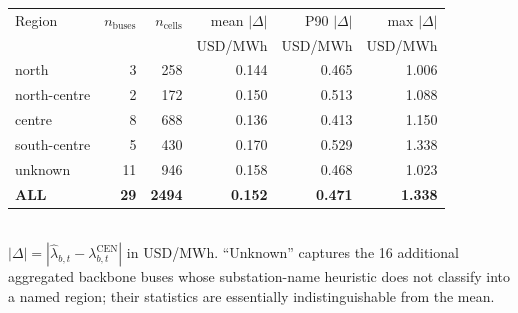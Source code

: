 \begin{tabular}{l r r r r r}
  \toprule
  Region        & $n_{\mathrm{buses}}$ & $n_{\mathrm{cells}}$ &
                  mean $|\Delta|$ & P90 $|\Delta|$ & max $|\Delta|$ \\
                & & & USD/MWh & USD/MWh & USD/MWh \\
  \midrule
  north         &  3 &  258 & 0.144 & 0.465 & 1.006 \\
  north-centre  &  2 &  172 & 0.150 & 0.513 & 1.088 \\
  centre        &  8 &  688 & 0.136 & 0.413 & 1.150 \\
  south-centre  &  5 &  430 & 0.170 & 0.529 & 1.338 \\
  unknown       & 11 &  946 & 0.158 & 0.468 & 1.023 \\
  \midrule
  \textbf{ALL}  & \textbf{29} & \textbf{2494} & \textbf{0.152} & \textbf{0.471} & \textbf{1.338} \\
  \bottomrule
\end{tabular}
\\[3pt]
{\footnotesize $|\Delta| =
|\hat\lambda_{b,t} - \lambda^{\mathrm{CEN}}_{b,t}|$ in
USD/MWh.  ``Unknown'' captures the \num{16} additional aggregated
backbone buses whose substation-name heuristic does not classify
into a named region; their statistics are essentially indistinguishable
from the mean.}
